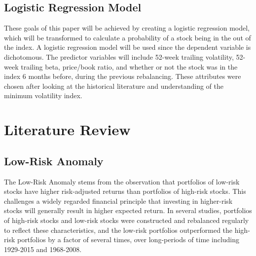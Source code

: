 \documentclass[12pt,twoside]{reedthesis}
\theoremstyle{definition}
\theoremstyle{definition}
\theoremstyle{definition}
\theoremstyle{remark}
\begin{document}
\subsection{Logistic Regression Model}\label{logistic-regression-model}

These goals of this paper will be achieved by creating a logistic
regression model, which will be transformed to calculate a probability
of a stock being in the out of the index. A logistic regression model
will be used since the dependent variable is dichotomous. The predictor
variables will include 52-week trailing volatility, 52-week trailing
beta, price/book ratio, and whether or not the stock was in the index 6
months before, during the previous rebalancing. These attributes were
chosen after looking at the historical literature and understanding of
the minimum volatility index.

\section{Literature Review}\label{literature-review}

\subsection{Low-Risk Anomaly}\label{low-risk-anomaly}

The Low-Risk Anomaly stems from the observation that portfolios of
low-risk stocks have higher risk-adjusted returns than portfolios of
high-risk stocks. This challenges a widely regarded financial principle
that investing in higher-risk stocks will generally result in higher
expected return. In several studies, portfolios of high-risk stocks and
low-risk stocks were constructed and rebalanced regularly to reflect
these characteristics, and the low-risk portfolios outperformed the
high-risk portfolios by a factor of several times, over long-periods of
time including 1929-2015 and 1968-2008.
\end{document}
